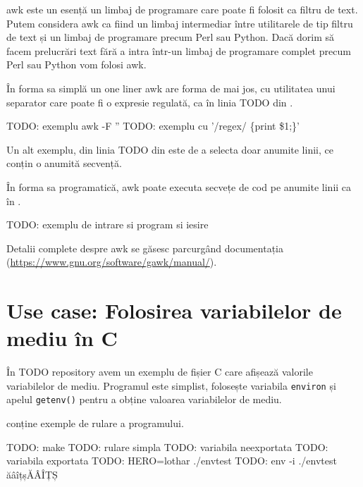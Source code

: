 awk este un esență un limbaj de programare care poate fi folosit ca filtru de
text. Putem considera awk ca fiind un limbaj intermediar între utilitarele de
tip filtru de text și un limbaj de programare precum Perl sau Python. Dacă dorim
să facem prelucrări text fără a intra într-un limbaj de programare complet
precum Perl sau Python vom folosi awk.

În forma sa simplă un one liner awk are forma de mai jos, cu utilitatea unui
separator care poate fi o expresie regulată, ca în linia TODO din .

\begin{screen}[caption={Folosirea awk},label={lst:cli:awk}]
TODO: exemplu awk -F ''
TODO: exemplu cu '/regex/ \{print \$1;\}'
\end{screen}

Un alt exemplu, din linia TODO din  este de a selecta doar anumite linii, ce conțin o anumită
secvență.

În forma sa programatică, awk poate executa secvețe de cod pe anumite linii ca în .

\begin{screen}[caption={Forma programatică a awk},label={lst:cli:awk-prog}]
TODO: exemplu de intrare si program si iesire
\end{screen}

Detalii complete despre awk se găsesc parcurgând documentația
(\url{https://www.gnu.org/software/gawk/manual/}).

\section{Use case: Folosirea variabilelor de mediu în C}
\label{sec:cli-c-env-vars}

În TODO repository avem un exemplu de fișier C care afișează valorile
variabilelor de mediu. Programul este simplist, folosește variabila \texttt{environ} și
apelul \texttt{getenv()} pentru a obține valoarea variabilelor de mediu.

 conține exemple de rulare a programului.

\begin{screen}[caption={Rularea unui program C care afișează variabilele de mediu},label={lst:cli:c-env}]
TODO: make
TODO: rulare simpla
TODO: variabila neexportata
TODO: variabila exportata
TODO: HERO=lothar ./envtest
TODO: env -i ./envtest
ăâîțșĂÂÎȚȘ
\end{screen}

